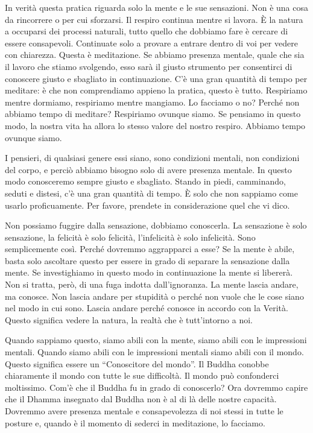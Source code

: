 In verità questa pratica riguarda solo la mente e le sue sensazioni. Non
è una cosa da rincorrere o per cui sforzarsi. Il respiro continua mentre
si lavora. È la natura a occuparsi dei processi naturali, tutto quello
che dobbiamo fare è cercare di essere consapevoli. Continuate solo a
provare a entrare dentro di voi per vedere con chiarezza. Questa è
meditazione. Se abbiamo presenza mentale, quale che sia il lavoro che
stiamo svolgendo, esso sarà il giusto strumento per consentirci di
conoscere giusto e sbagliato in continuazione. C'è una gran quantità di
tempo per meditare: è che non comprendiamo appieno la pratica, questo è
tutto. Respiriamo mentre dormiamo, respiriamo mentre mangiamo. Lo
facciamo o no? Perché non abbiamo tempo di meditare? Respiriamo ovunque
siamo. Se pensiamo in questo modo, la nostra vita ha allora lo stesso
valore del nostro respiro. Abbiamo tempo ovunque siamo.

I pensieri, di qualsiasi genere essi siano, sono condizioni mentali, non
condizioni del corpo, e perciò abbiamo bisogno solo di avere presenza
mentale. In questo modo conosceremo sempre giusto e sbagliato. Stando in
piedi, camminando, seduti e distesi, c'è una gran quantità di tempo. È
solo che non sappiamo come usarlo proficuamente. Per favore, prendete in
considerazione quel che vi dico.

Non possiamo fuggire dalla sensazione, dobbiamo conoscerla. La
sensazione è solo sensazione, la felicità è solo felicità, l'infelicità
è solo infelicità. Sono semplicemente così. Perché dovremmo aggrapparci
a esse? Se la mente è abile, basta solo ascoltare questo per essere in
grado di separare la sensazione dalla mente. Se investighiamo in questo
modo in continuazione la mente si libererà. Non si tratta, però, di una
fuga indotta dall'ignoranza. La mente lascia andare, ma conosce. Non
lascia andare per stupidità o perché non vuole che le cose siano nel
modo in cui sono. Lascia andare perché conosce in accordo con la Verità.
Questo significa vedere la natura, la realtà che è tutt'intorno a noi.

Quando sappiamo questo, siamo abili con la mente, siamo abili con le
impressioni mentali. Quando siamo abili con le impressioni mentali siamo
abili con il mondo. Questo significa essere un ``Conoscitore del
mondo''. Il Buddha conobbe chiaramente il mondo con tutte le sue
difficoltà. Il mondo può confonderci moltissimo. Com'è che il Buddha fu
in grado di conoscerlo? Ora dovremmo capire che il Dhamma insegnato dal
Buddha non è al di là delle nostre capacità. Dovremmo avere presenza
mentale e consapevolezza di noi stessi in tutte le posture e, quando è
il momento di sederci in meditazione, lo facciamo.

